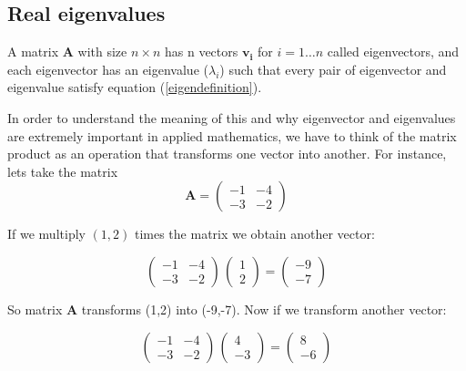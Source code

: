 \documentclass{tufte-book} %
\begin{document}
\subsection{Real eigenvalues}
A matrix $\mathbf{A}$ with size $n \times n$ has n vectors $\mathbf{v_i}$ for $i = 1 \dots n$ called eigenvectors, and each eigenvector has an eigenvalue ($\lambda_i$) such that every pair of eigenvector and eigenvalue satisfy equation (\ref{eigendefinition}).
	
In order to understand the meaning of this and why eigenvector and eigenvalues are extremely important in applied mathematics, we have to think of the matrix product as an operation that transforms one vector into another. For instance, lets take the matrix
\begin{equation}
	\mathbf{A}  = \begin{pmatrix} -1 & -4\\ -3 & -2\end{pmatrix} \nonumber
\end{equation}

If we multiply $(1,2)$ times the matrix we obtain another vector:

\begin{equation}
	 \begin{pmatrix} -1 & -4\\ -3 & -2\end{pmatrix} \,  \begin{pmatrix} 1\\ 2\end{pmatrix}=\begin{pmatrix} -9 \\ -7\end{pmatrix}\nonumber
\end{equation}

So matrix $\mathbf{A}$ transforms  (1,2) into  (-9,-7). Now if  we transform another vector:

\begin{equation}
	\begin{pmatrix} -1 & -4\\ -3 & -2\end{pmatrix} \,  \begin{pmatrix} 4\\ -3\end{pmatrix}=\begin{pmatrix} 8 \\ -6\end{pmatrix}\nonumber
\end{equation}
\end{document}
